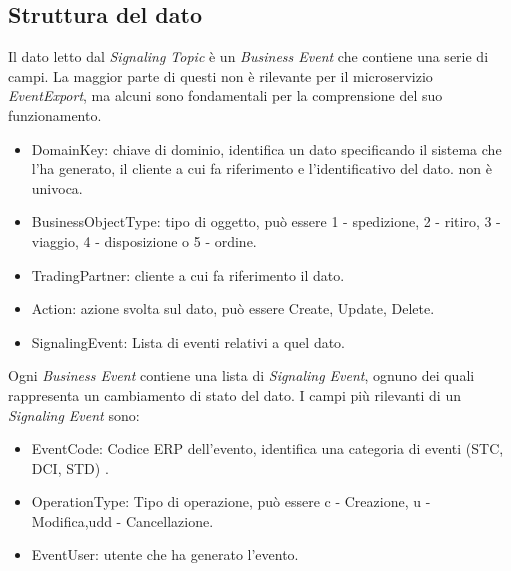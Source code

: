 \subsection{Struttura del dato}
\label{subsec:StrutturaDelDato}
Il dato letto dal \textit{Signaling Topic} è un \textit{Business Event} che contiene una serie di campi. 
La maggior parte di questi non è rilevante per il microservizio \textit{EventExport}, ma alcuni sono fondamentali per la comprensione del suo funzionamento.
\begin{itemize}
    \item DomainKey: chiave di dominio, identifica un dato specificando il sistema che l'ha generato, il cliente a cui fa riferimento e l'identificativo del dato. non è univoca.
    \item BusinessObjectType: tipo di oggetto, può essere 1 - spedizione, 2 - ritiro, 3 - viaggio, 4 - disposizione o 5 - ordine.
    \item TradingPartner: cliente a cui fa riferimento il dato.
    \item Action: azione svolta sul dato, può essere Create, Update, Delete.
    \item SignalingEvent: Lista di eventi relativi a quel dato.
\end{itemize}
Ogni \textit{Business Event} contiene una lista di \textit{Signaling Event}, ognuno dei quali rappresenta un cambiamento di stato del dato. I campi più rilevanti di un \textit{Signaling Event} sono:
\begin{itemize}
    \item EventCode: Codice ERP dell'evento, identifica una categoria di eventi (STC, DCI, STD)  .
    \item OperationType: Tipo di operazione, può essere c - Creazione, u - Modifica,udd - Cancellazione.
    \item EventUser: utente che ha generato l'evento. 
\end{itemize}

